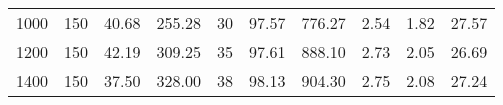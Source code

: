 \begin{table}[H]
{{\begin{tabular}{lrrrrrrrrr}
                1000       & 150                  & 40.68             & 255.28          & 30       & 97.57          & 776.27                     & 2.54      & 1.82              & 27.57                    \\
                1200       & 150                  & 42.19             & 309.25          & 35       & 97.61          & 888.10                     & 2.73      & 2.05              & 26.69                    \\
                1400       & 150                  & 37.50             & 328.00          & 38       & 98.13          & 904.30                     & 2.75      & 2.08              & 27.24                    \\
                \bottomrule
            \end{tabular}
        }
    }
\end{table}